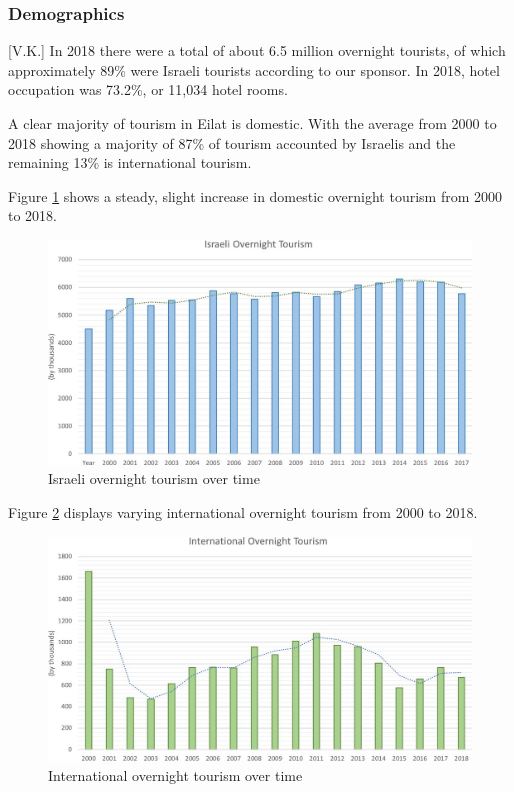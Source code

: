 \documentclass[12pt]{article}                       %
\begin{document}
\subsubsection{Demographics}[V.K.]
In 2018 there were a total of about 6.5 million overnight tourists, of which approximately 89\% were Israeli tourists according to our sponsor. In 2018, hotel occupation was 73.2\%, or 11,034 hotel rooms.

A clear majority of tourism in Eilat is domestic. With the average from 2000 to 2018 showing a majority of 87\% of tourism accounted by Israelis and the remaining 13\% is international tourism. 

Figure \ref{img:israeli_overnight_tourism} shows a steady, slight increase in domestic overnight tourism from 2000 to 2018.
\begin{figure}[H]
    \centering
    \includegraphics[width=12cm]{images/israeli_overnight_tourism.jpg}
    \caption{Israeli overnight tourism over time}
    \label{img:israeli_overnight_tourism}
\end{figure}

Figure \ref{img:international_overnight_tourism} displays varying international overnight tourism from 2000 to 2018.
\begin{figure}[H]
    \centering
    \includegraphics[width=12cm]{images/international_overnight_tourism.jpeg}
    \caption{International overnight tourism over time}
    \label{img:international_overnight_tourism}
\end{figure}
\end{document}
